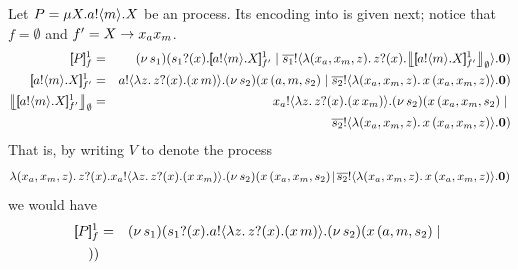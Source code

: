 \documentclass[runningheads]{llncs}
\begin{document}
{{%
\begin{example}
Let $P = \mu X. a ! \langle m \rangle . X$ be an \HOp process.
Its encoding into \HO is given next; notice that $f = \emptyset$ and $f' = X \rightarrow x_ax_m$.
\begin{eqnarray*}
	\pmapp{P}{1}{f} &=&
	\newsp{s_1}{ \binp{s_1}{x} \pmapp{\bout{a}{m} \varp{X}}{1}{{f'}} \Par \bout{\dual{s_1}}{ \abs{(x_a, x_m, z)} \binp{z}{x} \auxmapp{\pmapp{\bout{a}{m} \varp{X}}{1}{{f'}}}{{}}{\es} } \inact} \\
\pmapp{\bout{a}{m} \varp{X}}{1}{{ f'}} &=&
	\bout{a}{\abs{z}{\binp{z}{x} (\appl{x}{m})}} \newsp{s_2}{\appl{x}{(a,m, s_2)}  \Par \bout{\dual{s_2}}{\abs{(x_a, x_m, z)}{\appl{x}{(x_a, x_m, z)}}} \inact} \\
	\auxmapp{\pmapp{\bout{a}{m} \varp{X}}{1}{{f'}}}{{}}{\es}
	  & = & 
	\bout{x_a}{\abs{z}{\binp{z}{x} (\appl{x}{x_m})}} \newsp{s_2}{\appl{x}{(x_a,x_m, s_2)}  \Par \\
	& & \qquad \qquad \qquad \qquad \qquad \qquad \qquad \bout{\dual{s_2}}{\abs{(x_a, x_m, z)}{\appl{x}{(x_a, x_m, z)}}} \inact}
\end{eqnarray*}
That is, by writing $V$ to denote the process
$$
\lambda (x_a, x_m, z).\,z ? (x) . x_a ! \langle \lambda z.\,z ? (x) . (x\, {x_m}) \rangle . (\nu\, s_2)(x\, {(x_a,x_m, s_2)}  \!\;|\;\! \overline{s_2} ! \langle \lambda (x_a, x_m, z).\,x\, {(x_a, x_m, z)} \rangle . \mathbf{0})
$$
we would have %
\begin{eqnarray*}
[\!\![P]\!\!]^1_f & = & (\nu\, s_1)(s_1 ? (x) .  a ! \langle \lambda z.\,z ? (x) . (x\, {m}) \rangle . (\nu\, s_2)(x\, {(a,m, s_2)}  \;|\; \\
))
\end{eqnarray*}
\end{example}}}
\end{document}
